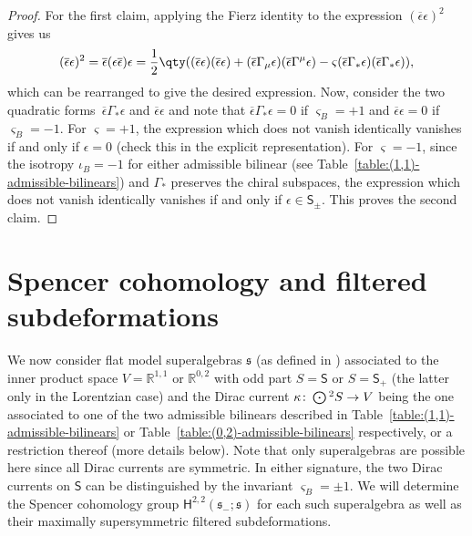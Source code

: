 \documentclass[10pt,a4paper]{amsart}
\numberwithin{equation}{section}
\newcommand{\fs}{\mathfrak{s}}
\newcommand{\RR}{\mathbb{R}}
\newcommand{\ssH}{\mathsf{H}}
\newcommand{\ssS}{\mathsf{S}}
\newcommand{\Odot}{\mathchoice{{\textstyle\bigodot}}{\bigodot}{\bigodot}{\bigodot}}
\newcommand{\1}{\mathbbm{1}}
\begin{document}
\begin{proof}
	For the first claim, applying the Fierz identity to the expression $(\overline\epsilon\epsilon)^2$ gives us
\[
		(\overline\epsilon\epsilon)^2 = \overline\epsilon(\epsilon\overline\epsilon)\epsilon
			= \frac{1}{2}\qty((\overline\epsilon\epsilon)(\overline\epsilon\epsilon) + (\overline\epsilon\Gamma_\mu\epsilon)(\overline\epsilon\Gamma^\mu\epsilon) - \varsigma(\overline\epsilon\Gamma_*\epsilon)(\overline\epsilon\Gamma_*\epsilon)),
\]
	which can be rearranged to give the desired expression. Now, consider the two quadratic forms~$\overline\epsilon\Gamma_*\epsilon$ and $\overline\epsilon\epsilon$ and note that $\overline\epsilon\Gamma_*\epsilon=0$ if $\varsigma_B=+1$ and $\overline\epsilon\epsilon=0$ if $\varsigma_B=-1$. For $\varsigma=+1$, the expression which does not vanish identically vanishes if and only if $\epsilon=0$ (check this in the explicit representation). For $\varsigma=-1$, since the isotropy $\iota_B=-1$ for either admissible bilinear (see Table~\ref{table:(1,1)-admissible-bilinears}) and $\Gamma_*$ preserves the chiral subspaces, the expression which does not vanish identically vanishes if and only if $\epsilon\in \ssS_\pm$. This proves the second claim.
\end{proof}


\section{Spencer cohomology and filtered subdeformations}
\label{sec:2d-spencer}

We now consider flat model superalgebras $\fs$ (as defined in \cite[Definition~2.1]{Beckett2024_2}) associated to the inner product space $V=\RR^{1,1}$ or $\RR^{0,2}$ with odd part $S=\ssS$ or $S=\ssS_+$ (the latter only in the Lorentzian case) and the Dirac current $\kappa\colon\Odot^2S\to V$ being the one associated to one of the two admissible bilinears described in Table~\ref{table:(1,1)-admissible-bilinears} or Table~\ref{table:(0,2)-admissible-bilinears} respectively, or a restriction thereof (more details below). Note that only superalgebras are possible here since all Dirac currents are symmetric. In either signature, the two Dirac currents on $\ssS$ can be distinguished by the invariant $\varsigma_B=\pm 1$. We will determine the Spencer cohomology group $\ssH^{2,2}(\fs_-;\fs)$ for each such superalgebra as well as their maximally supersymmetric filtered subdeformations.
\end{document}
